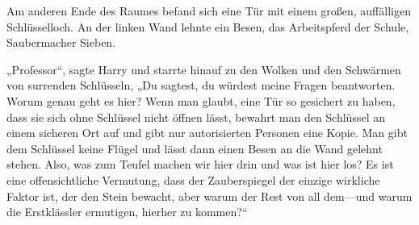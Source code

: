 Am anderen Ende des Raumes befand sich eine Tür mit einem großen, auffälligen Schlüsselloch.
An der linken Wand lehnte ein Besen, das Arbeitspferd der Schule, Saubermacher Sieben.

„Professor“, sagte Harry und starrte hinauf zu den Wolken und den Schwärmen von surrenden Schlüsseln, „Du sagtest, du würdest meine Fragen beantworten. Worum genau geht es hier? Wenn man glaubt, eine Tür so gesichert zu haben, dass sie sich ohne Schlüssel nicht öffnen lässt, bewahrt man den Schlüssel an einem sicheren Ort auf und gibt nur autorisierten Personen eine Kopie. Man gibt dem Schlüssel keine Flügel und lässt dann einen Besen an die Wand gelehnt stehen. Also, was zum Teufel machen wir hier drin und was ist hier los? Es ist eine offensichtliche Vermutung, dass der Zauberspiegel der einzige wirkliche Faktor ist, der den Stein bewacht, aber warum der Rest von all dem—und warum die Erstklässler ermutigen, hierher zu kommen?“


